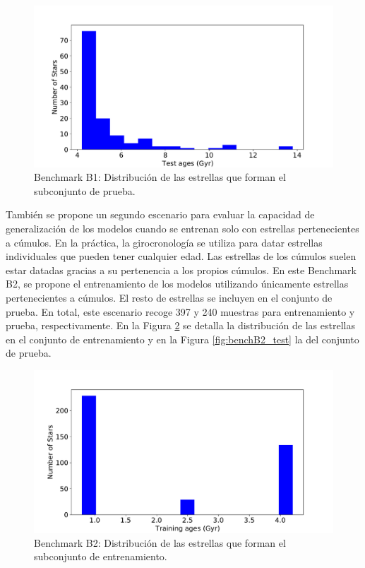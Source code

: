 \begin{figure}[H]
\begin{center}
 \includegraphics[width=0.8\linewidth]{Figuras/Experimentos/B_B1_test.pdf}
\end{center}
\caption{Benchmark B1: Distribución de las estrellas que forman el subconjunto de prueba.}
 \label{fig:benchB1_test}
\end{figure}

También se propone un segundo escenario para evaluar la capacidad de generalización de los modelos cuando se entrenan solo con estrellas pertenecientes a cúmulos. En la práctica, la girocronología se utiliza para datar estrellas individuales que pueden tener cualquier edad. Las estrellas de los cúmulos suelen estar datadas gracias a su pertenencia a los propios cúmulos. En este Benchmark B2, se propone el entrenamiento de los modelos utilizando únicamente estrellas pertenecientes a cúmulos. El resto de estrellas se incluyen en el conjunto de prueba. En total, este escenario recoge 397 y 240 muestras para entrenamiento y prueba, respectivamente. En la Figura \ref{fig:benchB2_train} se detalla la distribución de las estrellas en el conjunto de entrenamiento y en la Figura \ref{fig:benchB2_test} la del conjunto de prueba. %

\begin{figure}[H]
\begin{center}
 \includegraphics[width=0.8\linewidth]{Figuras/Experimentos/B_B2_training.pdf}
\end{center}
\caption{Benchmark B2: Distribución de las estrellas que forman el subconjunto de entrenamiento.}
 \label{fig:benchB2_train}
\end{figure}

